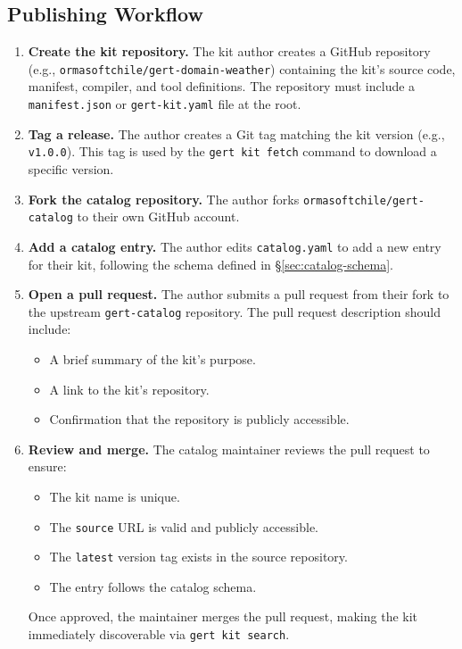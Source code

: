 \subsection{Publishing Workflow}

\begin{enumerate}
  \item \textbf{Create the kit repository.} The kit author creates a GitHub repository (e.g., \texttt{ormasoftchile/gert-domain-weather}) containing the kit's source code, manifest, compiler, and tool definitions. The repository must include a \texttt{manifest.json} or \texttt{gert-kit.yaml} file at the root.

  \item \textbf{Tag a release.} The author creates a Git tag matching the kit version (e.g., \texttt{v1.0.0}). This tag is used by the \texttt{gert kit fetch} command to download a specific version.

  \item \textbf{Fork the catalog repository.} The author forks \texttt{ormasoftchile/gert-catalog} to their own GitHub account.

  \item \textbf{Add a catalog entry.} The author edits \texttt{catalog.yaml} to add a new entry for their kit, following the schema defined in \S\ref{sec:catalog-schema}.

  \item \textbf{Open a pull request.} The author submits a pull request from their fork to the upstream \texttt{gert-catalog} repository. The pull request description should include:
  \begin{itemize}
    \item A brief summary of the kit's purpose.
    \item A link to the kit's repository.
    \item Confirmation that the repository is publicly accessible.
  \end{itemize}

  \item \textbf{Review and merge.} The catalog maintainer reviews the pull request to ensure:
  \begin{itemize}
    \item The kit name is unique.
    \item The \texttt{source} URL is valid and publicly accessible.
    \item The \texttt{latest} version tag exists in the source repository.
    \item The entry follows the catalog schema.
  \end{itemize}
  Once approved, the maintainer merges the pull request, making the kit immediately discoverable via \texttt{gert kit search}.
\end{enumerate}

